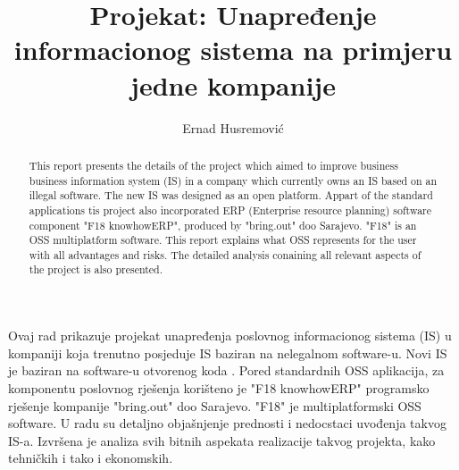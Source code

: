 \documentclass[times, utf8, seminar]{fit}
\begin{document}
\title{Projekat: Unapređenje informacionog sistema na primjeru jedne kompanije}

\author{Ernad Husremović}


\maketitle

\tableofcontents

\listoftables
\listoffigures

\begin{sazetak}

Ovaj rad prikazuje projekat unapređenja poslovnog informacionog sistema (IS) u kompaniji koja trenutno posjeduje IS baziran na nelegalnom software-u. 
Novi IS je baziran na software-u otvorenog koda .
Pored standardnih OSS aplikacija, za komponentu poslovnog rješenja korišteno je "F18 knowhowERP" programsko rješenje kompanije "bring.out" doo Sarajevo. "F18" je multiplatformski OSS software.
U radu su detaljno objašnjenje prednosti i nedocstaci uvođenja takvog IS-a.
Izvršena je analiza svih bitnih aspekata realizacije takvog projekta, kako tehničkih i tako i ekonomskih. 

\end{sazetak}

\begin{abstract}

This report presents the details of the project which aimed to improve business business information system (IS) in a company which currently owns an IS based on an illegal software. The new IS was designed as an open platform. Appart of the standard applications tis project also incorporated ERP (Enterprise resource planning) software component "F18 knowhowERP", produced by "bring.out" doo Sarajevo. "F18" is an OSS multiplatform software. This report explains what OSS represents for the user with all advantages and risks. The detailed analysis conaining all relevant aspects of the project is also presented.

\end{abstract}
\end{document}
